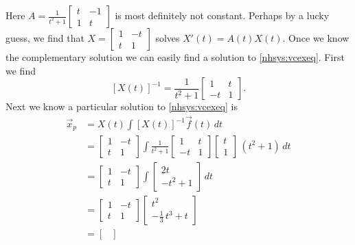 \begin{example}
Here $A = 
\frac{1}{t^2+1}
\left[ \begin{smallmatrix}
t & -1 \\
1 & t
\end{smallmatrix} \right]$ is most definitely not constant.
Perhaps by a lucky guess, we find that
$X = 
\left[ \begin{smallmatrix}
1 & -t \\
t & 1
\end{smallmatrix} \right]$ solves
$X'(t) = A(t) X(t)$.  Once we know the complementary solution we can easily find
a solution to \eqref{nhsys:vcexeq}.  First we find
\begin{equation*}
\left[ X(t) \right]^{-1}
=
\frac{1}{t^2+1}
\begin{bmatrix}
1 & t \\
-t & 1
\end{bmatrix} .
\end{equation*}
Next we know a particular solution to
\eqref{nhsys:vcexeq} is
\begin{equation*}
\begin{split}
\vec{x}_p & = 
X(t)
\int \left[X(t)\right]^{-1}\vec{f}(t) \, dt 
\\
& =
\begin{bmatrix}
1 & -t \\
t & 1
\end{bmatrix} 
\int
\frac{1}{t^2+1}
\begin{bmatrix}
1 & t \\
-t & 1
\end{bmatrix}
\begin{bmatrix} t \\ 1 \end{bmatrix} \,(t^2+1) 
\,dt
\\
& =
\begin{bmatrix}
1 & -t \\
t & 1
\end{bmatrix} 
\int
\begin{bmatrix}
2t \\
-t^2 + 1
\end{bmatrix} 
\,dt
\\
& =
\begin{bmatrix}
1 & -t \\
t & 1
\end{bmatrix} 
\begin{bmatrix}
t^2 \\
-\frac{1}{3}\,t^3 + t
\end{bmatrix} 
\\
& =
\begin{bmatrix}

\end{bmatrix}
\end{split}
\end{equation*}
\end{example}
